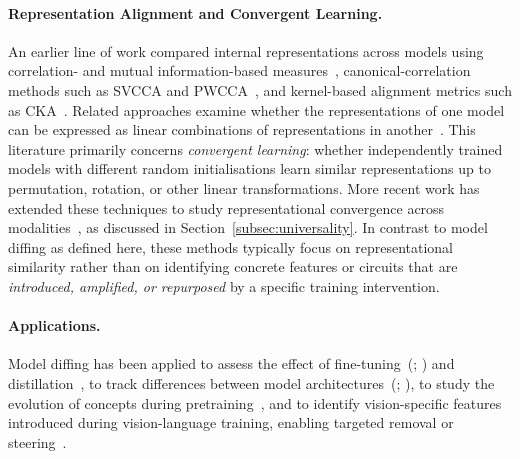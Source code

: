 \paragraph{Representation Alignment and Convergent Learning.} An earlier line of work compared internal representations across models using correlation- and mutual information-based measures~, canonical-correlation methods such as SVCCA and PWCCA~, and kernel-based alignment metrics such as CKA~. Related approaches examine whether the representations of one model can be expressed as linear combinations of representations in another~. This literature primarily concerns \emph{convergent learning}: whether independently trained models with different random initialisations learn similar representations up to permutation, rotation, or other linear transformations. More recent work has extended these techniques to study representational convergence across modalities~, as discussed in Section~\ref{subsec:universality}.
In contrast to model diffing as defined here, these methods typically focus on representational similarity rather than on identifying concrete features or circuits that are \emph{introduced, amplified, or repurposed} by a specific training intervention.

\paragraph{Applications.} Model diffing has been applied to assess the effect of fine-tuning~(; ) and distillation~, to track differences between model architectures~(; ), to study the evolution of concepts during pretraining~, and to identify vision-specific features introduced during vision-language training, enabling targeted removal or steering~.


